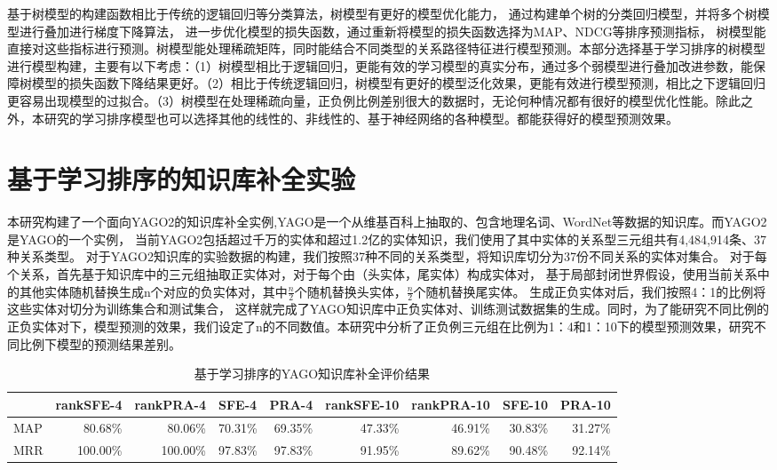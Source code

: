 基于树模型的构建函数相比于传统的逻辑回归等分类算法，树模型有更好的模型优化能力，
通过构建单个树的分类回归模型，并将多个树模型进行叠加进行梯度下降算法，
进一步优化模型的损失函数，通过重新将模型的损失函数选择为MAP、NDCG等排序预测指标，
树模型能直接对这些指标进行预测。树模型能处理稀疏矩阵，同时能结合不同类型的关系路径特征进行模型预测。本部分选择基于学习排序的树模型进行模型构建，主要有以下考虑：（1）树模型相比于逻辑回归，更能有效的学习模型的真实分布，通过多个弱模型进行叠加改进参数，能保障树模型的损失函数下降结果更好。（2）相比于传统逻辑回归，树模型有更好的模型泛化效果，更能有效进行模型预测，相比之下逻辑回归更容易出现模型的过拟合。（3）树模型在处理稀疏向量，正负例比例差别很大的数据时，无论何种情况都有很好的模型优化性能。除此之外，本研究的学习排序模型也可以选择其他的线性的、非线性的、基于神经网络的各种模型。都能获得好的模型预测效果。

\section{基于学习排序的知识库补全实验}
\label{cha:exp-relational}

本研究构建了一个面向YAGO2的知识库补全实例,YAGO是一个从维基百科上抽取的、包含地理名词、WordNet等数据的知识库。而YAGO2是YAGO的一个实例，
当前YAGO2包括超过千万的实体和超过1.2亿的实体知识，我们使用了其中实体的关系型三元组共有4,484,914条、37种关系类型。
对于YAGO2知识库的实验数据的构建，我们按照37种不同的关系类型，将知识库切分为37份不同关系的实体对集合。
对于每个关系，首先基于知识库中的三元组抽取正实体对，对于每个由（头实体，尾实体）构成实体对，
基于局部封闭世界假设，使用当前关系中的其他实体随机替换生成n个对应的负实体对，其中$\frac{n}{2}$个随机替换头实体，$\frac{n}{2}$个随机替换尾实体。
生成正负实体对后，我们按照4：1的比例将这些实体对切分为训练集合和测试集合，
这样就完成了YAGO知识库中正负实体对、训练测试数据集的生成。同时，为了能研究不同比例的正负实体对下，模型预测的效果，我们设定了n的不同数值。本研究中分析了正负例三元组在比例为1：4和1：10下的模型预测效果，研究不同比例下模型的预测结果差别。

\begin{table}[htbp]
  \centering
  \caption{基于学习排序的YAGO知识库补全评价结果}
    \begin{tabular}{|l|r|r|r|r|r|r|r|r|}
    \hline
          & \multicolumn{1}{l|}{rankSFE-4} & \multicolumn{1}{l|}{rankPRA-4} & \multicolumn{1}{l|}{SFE-4} & \multicolumn{1}{l|}{PRA-4} & \multicolumn{1}{l|}{rankSFE-10} & \multicolumn{1}{l|}{rankPRA-10} & \multicolumn{1}{l|}{SFE-10} & \multicolumn{1}{l|}{PRA-10} \bigstrut\\
    \hline
    MAP   & 80.68\% & 80.06\% & 70.31\% & 69.35\% & 47.33\% & 46.91\% & 30.83\% & 31.27\% \bigstrut\\
    \hline
    MRR   & 100.00\% & 100.00\% & 97.83\% & 97.83\% & 91.95\% & 89.62\% & 90.48\% & 92.14\% \bigstrut\\
    \hline
    \end{tabular}%
  \label{tab:kbc-yago-rank}%
\end{table}%

